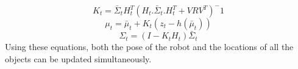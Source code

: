 		\begin{equation}
 		K_{t}=\bar{\Sigma}_{t}H_{t}^{T}(H_{t}.\bar{\Sigma}_{t}.H_{t}^{T}+VRV^{T})^-1
 		\end{equation}
 		\begin{equation}
 		\mu_{t}=\bar{\mu}_t+K_t(z_t-h(\bar{\mu}_t))
 		\end{equation}
 		\begin{equation}
 		\Sigma_t=(I-K_tH_t)\bar{\Sigma}_t
 		\end{equation}
Using these equations, both the pose of the robot and the locations of all the objects can be updated simultaneously.